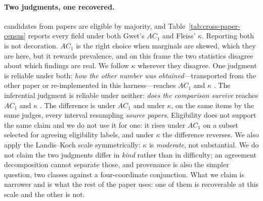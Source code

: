 \documentclass[11pt]{article}
\begin{document}
\paragraph{Two judgments, one recovered.}
\CensusEligible{} candidates from \CensusPapers{} papers are eligible by
majority, and Table~\ref{tab:cross-paper-census} reports every field under both
Gwet's $AC_1$ and Fleiss' $\kappa$. Reporting both is not decoration. $AC_1$ is
the right choice when marginals are skewed, which they are here, but it rewards
prevalence, and on this frame the two statistics disagree about which findings
are real. We follow $\kappa$ wherever they disagree. One judgment is reliable
under both: \emph{how the other number was obtained}---transported from the
other paper or re-implemented in this harness---reaches $AC_1$ \DecProv{} and
$\kappa$ \DecProvK{}. The inferential judgment is reliable under neither:
\emph{does the comparison survive} reaches $AC_1$ \DecVerdict{} and $\kappa$
\DecVerdictK{}. The difference is \DecGap{} \DecGapCI{} under $AC_1$ and
\DecGapK{} \DecGapKCI{} under $\kappa$, on the same items by the same judges,
every interval resampling \emph{source papers}. Eligibility does not support the
same claim and we do not use it for one: it rises under $AC_1$ on a subset
selected for agreeing eligibility labels, and under $\kappa$ the difference
reverses. We also apply the Landis--Koch scale symmetrically: $\kappa$
\DecProvK{} is \emph{moderate}, not substantial. We do not claim the two
judgments differ in \emph{kind} rather than in difficulty; an agreement
decomposition cannot separate those, and provenance is also the simpler
question, two classes against a four-coordinate conjunction. What we claim is
narrower and is what the rest of the paper uses: one of them is recoverable at
this scale and the other is not.
\end{document}
